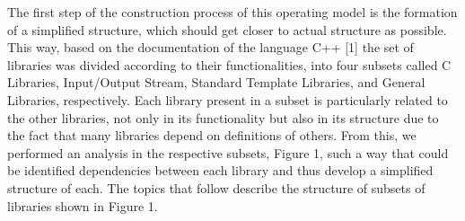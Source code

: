 \documentclass[a4paper]{llncs}
\begin{document}
The first step of the construction process of this operating model is the formation of a simplified structure, which should get closer to actual structure as possible. This way, based on the documentation of the language C++ [1] the set of libraries was divided according to their functionalities, into four subsets called C Libraries, Input/Output Stream, Standard Template Libraries, and General Libraries, respectively. Each library present in a subset is particularly related to the other libraries, not only in its functionality but also in its structure due to the fact that many libraries depend on definitions of others. From this, we performed an analysis in the respective subsets, Figure 1, such a way that could be identified dependencies between each library and thus develop a simplified structure of each. The topics that follow describe the structure of subsets of libraries shown in Figure 1.
%
\end{document}
